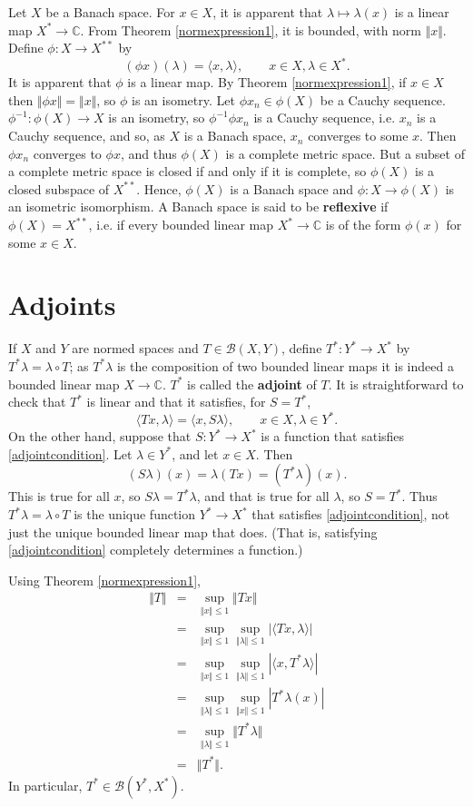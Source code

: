 \documentclass{article}
\newcommand{\inner}[2]{\langle #1, #2 \rangle}
\newcommand{\norm}[1]{\Vert #1 \Vert}
\begin{document}
Let $X$ be a Banach space.
For $x \in X$, it is apparent that $\lambda \mapsto \lambda(x)$ is a linear
map $X^* \to \mathbb{C}$. From Theorem \ref{normexpression1}, it is bounded, with norm $\norm{x}$.
Define $\phi:X \to X^{**}$ by
\[
(\phi x)(\lambda)=\inner{x}{\lambda}, \qquad x \in X, \lambda \in X^*.
\]
It is apparent that $\phi$ is a linear map. By Theorem \ref{normexpression1}, if $x \in X$ then $\norm{\phi x}=\norm{x}$, so
$\phi$ is an isometry. 
Let $\phi x_n \in \phi(X)$ be a Cauchy sequence. $\phi^{-1}:\phi(X) \to X$ is an isometry, so
$\phi^{-1} \phi x_n$ is a Cauchy sequence, i.e. $x_n$ is a Cauchy sequence, and so, as $X$ is a Banach space, $x_n$ converges to some $x$. Then
$\phi x_n$ converges to $\phi x$, and thus $\phi(X)$ is a complete metric space. But a subset of a complete metric space is closed if and only if it is complete, so
$\phi(X)$ is a closed subspace of $X^{**}$. Hence, $\phi(X)$ is a Banach space and $\phi:X \to \phi(X)$ is an isometric isomorphism.
A Banach space is said to be \textbf{reflexive} if $\phi(X) = X^{**}$, i.e. if every bounded linear map $X^* \to \mathbb{C}$ is of the form $\phi(x)$ for some $x \in X$.



\section{Adjoints}
If $X$ and $Y$ are normed spaces and $T \in \mathscr{B}(X,Y)$, 
define $T^*:Y^* \to X^*$ by $T^* \lambda=\lambda \circ T$; as $T^*\lambda$ is the composition of two bounded linear
maps it is indeed a bounded linear map $X \to \mathbb{C}$. $T^*$ is called the \textbf{adjoint} of $T$.
It is straightforward to check that $T^*$ is linear and that it satisfies, for $S=T^*$,
\begin{equation}
\inner{Tx}{\lambda}=\inner{x}{S\lambda}, \qquad x \in X, \lambda \in Y^*.
\label{adjointcondition}
\end{equation}
On the other hand, suppose that $S:Y^* \to X^*$ is a function that satisfies \eqref{adjointcondition}. Let $\lambda \in Y^*$, and let
$x \in X$. Then
\[
(S\lambda)(x) = \lambda(Tx)= (T^*\lambda)(x).
\]
This is true for all $x$, so $S\lambda=T^*\lambda$, and that is true for all $\lambda$, so $S=T^*$. Thus $T^*\lambda=
\lambda \circ T$ is the unique function $Y^* \to X^*$ that satisfies \eqref{adjointcondition}, not just the unique bounded linear
map that does. (That is, satisfying \eqref{adjointcondition} completely determines a function.)

Using Theorem \ref{normexpression1}, 
\begin{eqnarray*}
\norm{T}&=&\sup_{\norm{x} \leq 1} \norm{Tx}\\
&=&\sup_{\norm{x} \leq 1} \sup_{\norm{\lambda} \leq 1} |\inner{Tx}{\lambda}|\\
&=&\sup_{\norm{x} \leq 1} \sup_{\norm{\lambda} \leq 1} |\inner{x}{T^*\lambda}|\\
&=&\sup_{\norm{\lambda} \leq 1} \sup_{\norm{x} \leq 1} |T^*\lambda(x)|\\
&=&\sup_{\norm{\lambda} \leq 1} \norm{T^*\lambda}\\
&=&\norm{T^*}.
\end{eqnarray*}
In particular, $T^* \in \mathscr{B}(Y^*,X^*)$.
\end{document}
